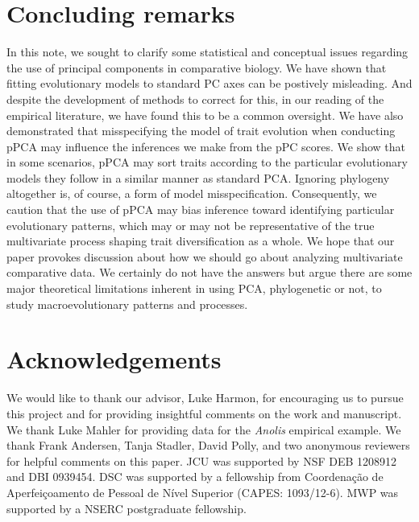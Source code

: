 \documentclass[a4paper,11pt]{article}
\begin{document}
\section{Concluding remarks}
In this note, we sought to clarify some statistical and conceptual issues regarding the use of principal components in comparative biology. We have shown that fitting evolutionary models to standard PC axes can be postively misleading. And despite the development of methods to correct for this, in our reading of the empirical literature, we have found this to be a common oversight. We have also demonstrated that misspecifying the model of trait evolution when conducting pPCA may influence the inferences we make from the pPC scores. We show that in some scenarios, pPCA may sort traits according to the particular evolutionary models they follow in a similar manner as standard PCA. Ignoring phylogeny altogether is, of course, a form of model misspecification. Consequently, we caution that the use of pPCA may bias inference toward identifying particular evolutionary patterns, which may or may not be representative of the true multivariate process shaping trait diversification as a whole. We hope that our paper provokes discussion about how we should go about analyzing multivariate comparative data. We certainly do not have the answers but argue there are some major theoretical limitations inherent in using PCA, phylogenetic or not, to study macroevolutionary patterns and processes.

\section{Acknowledgements}

We would like to thank our advisor, Luke Harmon, for encouraging us to pursue this project and for providing insightful comments on the work and manuscript. We thank Luke Mahler for providing data for the \textit{Anolis} empirical example. We thank Frank Andersen, Tanja Stadler, David Polly, and two anonymous reviewers for helpful comments on this paper. JCU was supported by NSF DEB 1208912 and DBI 0939454. DSC was supported by a fellowship from Coordena\c{c}\~{a}o de Aperfei\c{c}oamento de Pessoal de N\'{i}vel Superior (CAPES: 1093/12-6). MWP was supported by a NSERC postgraduate fellowship. 

\newpage


\end{document}
